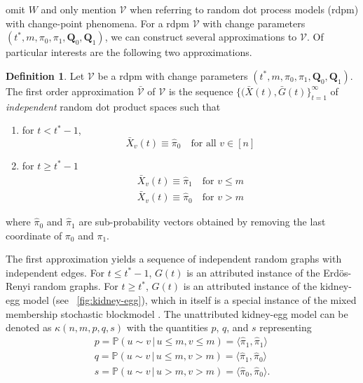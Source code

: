 \documentclass[10pt,journal,compsoc]{IEEEtran}
\theoremstyle{definition}
\newtheorem{definition}{Definition}
\begin{document}
omit $W$ and only mention $\mathscr{V}$ when referring to random dot
process models (rdpm) with change-point phenomena. For a rdpm
$\mathscr{V}$ with change parameters $(t^{*}, m, \pi_0, \pi_1,
\mathbf{Q}_0, \mathbf{Q}_1)$, we can construct several approximations
to $\mathscr{V}$. Of particular interests are the following two
approximations.
\begin{definition}
  \label{def:1}
  Let $\mathscr{V}$ be a rdpm with change parameters $(t^{*}, m,
  \pi_0, \pi_1, \mathbf{Q}_0, \mathbf{Q}_1)$. The first order approximation
  $\bar{\mathscr{V}}$ of $\mathscr{V}$ is the sequence $\{(\bar{X}(t),
  \bar{G}(t)\}_{t = 1}^{\infty}$ of {\em independent} random dot product
  spaces such that
 \begin{enumerate}
 \item for $t < t^{*} - 1$,
   \begin{equation}
     \label{eq:5}
     \bar{X}_{v}(t)  \equiv \hat{\pi}_0 \quad \text{for all $v \in [n]$}
   \end{equation}
 \item for $t \geq t^{*} - 1$
   \begin{gather*}
     \bar{X}_{v}(t) \equiv \hat{\pi}_1 \quad \text{for $v \leq m$} \\
     \bar{X}_{v}(t) \equiv \hat{\pi}_0 \quad \text{for $v > m$} 
   \end{gather*}
 \end{enumerate}
 where $\hat{\pi}_0$ and $\hat{\pi}_1$ are sub-probability vectors
 obtained by removing the last coordinate of $\pi_0$ and $\pi_1$. 
\end{definition}
The first approximation yields a sequence of independent random graphs
with independent edges. For $t \leq t^{*} - 1$, $G(t)$ is an
attributed instance of the Erd\"{o}s-Renyi random graphs. For $t \geq
t^{*}$, $G(t)$ is an attributed instance of the kidney-egg model
\cite{rukhin11} (see \figurename~\ref{fig:kidney-egg}), which in
itself is a special instance of the mixed membership stochastic
blockmodel \cite{airoldi08:_mixed}. The unattributed kidney-egg model
can be denoted as $\kappa(n,m,p,q,s)$ with the quantities $p$, $q$,
and $s$ representing
\begin{gather*}
p = \mathbb{P}(u \sim v \, | \, u \leq m, v \leq m) = \langle
\hat{\pi}_1, \hat{\pi}_1 \rangle \\ q =
\mathbb{P}(u \sim v \, | \, u \leq m, v > m) = \langle \hat{\pi}_1,
\hat{\pi}_0 \rangle \\ s = \mathbb{P}(u
\sim v \, | \, u > m, v > m) = \langle \hat{\pi}_0, \hat{\pi}_0
\rangle . 
\end{gather*}
\end{document}
